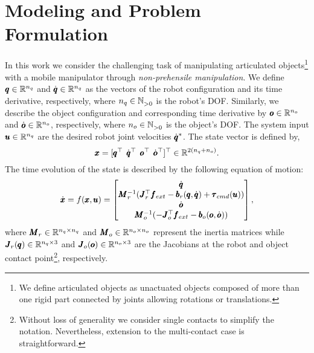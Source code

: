 \section{Modeling and Problem Formulation} \label{sec:formulation}

In this work we consider the challenging task of manipulating articulated objects\footnote{We define articulated objects as unactuated objects composed of more than one rigid part connected by joints allowing rotations or translations.} with a mobile manipulator through \textit{non-prehensile manipulation}. We define $\pmb{q} \in \mathbb{R}^{n_q}$ and $\dot{\pmb{q}} \in \mathbb{R}^{n_q}$ as the vectors of the robot configuration and its time derivative, respectively, where $n_q \in \mathbb{N}^{}_{>0}$ is the robot's DOF.
Similarly, we describe the object configuration and corresponding time derivative by $\pmb{o} \in \mathbb{R}^{n_o}$ and $\dot{\pmb{o}} \in \mathbb{R}^{n_o}$, respectively, where $n_o \in \mathbb{N}^{}_{>0}$ is the object's DOF. The system input $\pmb{u}  \in \mathbb{R}^{n_q}$ are the desired robot joint velocities $\dot{\pmb{q}}^*$. The state vector is defined by,
\begin{equation}
    \pmb{x} = [\pmb{q}^\top \;\, 
      \dot{\pmb{q}}^\top \;\, 
      \pmb{o}^\top \;\,
      \dot{\pmb{o}}^\top ]^\top  \in \mathbb{R}^{2(n_q + n_o)}.
\end{equation}
The time evolution of the state is described by the following equation of motion:
\begin{equation} \label{eq:eom}
    \dot{\pmb{x}} = f(\pmb{x}, \pmb{u}) =  
    \begin{bmatrix}
      \dot{\pmb{q}} \\
      \pmb{M}_r^{-1}(\pmb{J}_{r}^\top \pmb{f}_{ext} - \pmb{b}_{r}(\pmb{q}, \dot{\pmb{q}}) + \pmb{\tau}_{cmd}(\pmb{u})) \\
      \dot{\pmb{o}} \\
      \pmb{M}_o^{-1}(-\pmb{J}_{o}^\top \pmb{f}_{ext} - \pmb{b}_{o}(\pmb{o}, \dot{\pmb{o}}))
    \end{bmatrix},
\end{equation}
where $\pmb{M}_r \in \mathbb{R}^{n_q \times n_q}$ and $\pmb{M}_o \in \mathbb{R}^{n_o \times n_o}$ represent the inertia matrices while $\pmb{J}_r(\pmb{q}) \in \mathbb{R}^{n_q \times 3}$ and $\pmb{J}_o(\pmb{o}) \in \mathbb{R}^{n_o \times 3}$ are the Jacobians at the robot and object contact point\footnote{Without loss of generality we consider single contacts to simplify the notation. Nevertheless, extension to the multi-contact case is straightforward.}, respectively.
